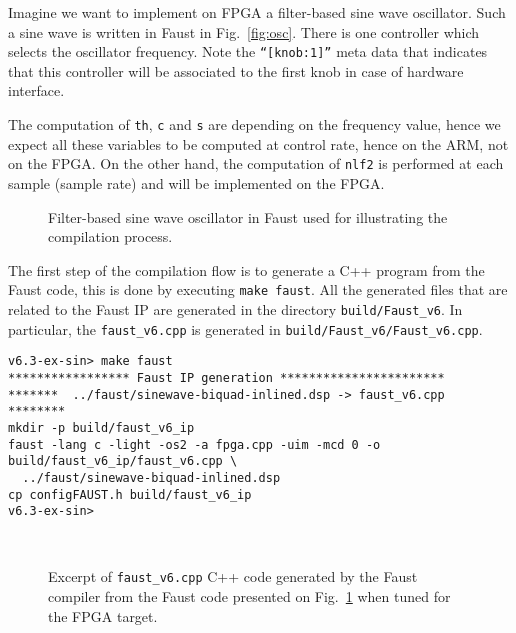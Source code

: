 \label{example}
\label{sec:example}
Imagine we want to implement on FPGA a filter-based sine wave oscillator. Such a sine wave is written in Faust in Fig.~\ref{fig:osc}. There is one controller which selects the oscillator frequency. Note the {\tt ``[knob:1]''} meta data that indicates that this controller will be associated to the first knob in case of hardware interface.

The computation of {\tt th}, {\tt c} and {\tt s} are depending on the frequency value, hence we expect all these variables to be computed at control rate, hence on the ARM, not on the FPGA. On the other hand, the computation of {\tt nlf2} is performed at each sample (sample rate) and will be implemented on the FPGA.


\begin{figure}[ht]
  \begin{boxedminipage}{\columnwidth}
    \tiny
    
  \end{boxedminipage}
  \caption{Filter-based sine wave oscillator in Faust used for illustrating the compilation process.}
  \label{fig:osc}
  \label{fig:biquad}
\end{figure}

The first step of the compilation flow is to generate a C++ program from the Faust code, this is done by executing {\tt make faust}. All the generated files that are related to the Faust IP are generated in the directory {\tt build/Faust\_v6}. In particular, the {\tt faust\_v6.cpp} is generated in {\tt build/Faust\_v6/Faust\_v6.cpp}.\\

\begin{boxedminipage}{1.03\textwidth}
  \small
\begin{verbatim}
v6.3-ex-sin> make faust
***************** Faust IP generation ***********************
*******  ../faust/sinewave-biquad-inlined.dsp -> faust_v6.cpp  ********
mkdir -p build/faust_v6_ip
faust -lang c -light -os2 -a fpga.cpp -uim -mcd 0 -o build/faust_v6_ip/faust_v6.cpp \
  ../faust/sinewave-biquad-inlined.dsp
cp configFAUST.h build/faust_v6_ip
v6.3-ex-sin>
\end{verbatim}
\end{boxedminipage}
~\\

\begin{figure}[ht]
  \begin{boxedminipage}{\columnwidth}
    \tiny
    
  \end{boxedminipage}
  \caption{Excerpt of {\tt faust\_v6.cpp} C++ code generated by the Faust compiler from the Faust code presented on Fig.~\ref{fig:biquad} when tuned for the FPGA target.}
  \label{fig:oscCode}
  \label{fig:biquadCode}
\end{figure}

